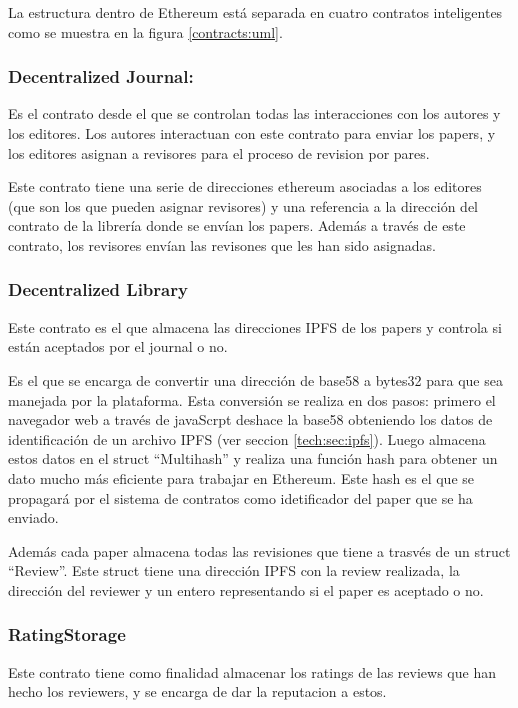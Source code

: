 
La estructura dentro de Ethereum está separada en cuatro contratos inteligentes
como se muestra en la figura \ref{contracts:uml}.

\subsubsection*{Decentralized Journal:} Es el contrato desde el que se controlan
todas las interacciones con los autores y los editores. Los autores interactuan
con este contrato para enviar los papers, y los editores asignan a revisores
para el proceso de revision por pares.

Este contrato tiene una serie de direcciones ethereum asociadas a los editores
(que son los que pueden asignar revisores) y una referencia a la dirección del
contrato de la librería donde se envían los papers. Además a través de este
contrato, los revisores envían las revisones que les han sido asignadas.

\subsubsection*{Decentralized Library} Este contrato es el que almacena las
direcciones IPFS de los papers y controla si están aceptados por el journal o
no.

Es el que se encarga de convertir una dirección de base58 a bytes32 para que sea
manejada por la plataforma. Esta conversión se realiza en dos pasos: primero el
navegador web a través de javaScrpt deshace la base58 obteniendo los datos de
identificación de un archivo IPFS (ver seccion \ref{tech:sec:ipfs}). Luego
almacena estos datos en el struct ``Multihash'' y realiza una función hash para
obtener un dato mucho más eficiente para trabajar en Ethereum. Este hash es el
que se propagará por el sistema de contratos como idetificador del paper que se
ha enviado.

Además cada paper almacena todas las revisiones que tiene a trasvés de un struct
``Review''. Este struct tiene una dirección IPFS con la review realizada, la
dirección del reviewer y un entero representando si el paper es aceptado o no.

\subsubsection*{RatingStorage}
Este contrato tiene como finalidad almacenar los ratings de las reviews que han
hecho los reviewers, y se encarga de dar la reputacion a estos.

